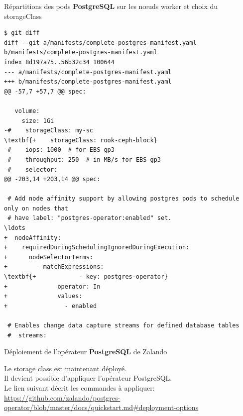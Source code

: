 \begin{frame}[shrink=5,fragile]{Répartitions des pods \textbf{PostgreSQL} sur les n{\oe}uds worker et choix du storageClass}

\begin{tiny}
\begin{Verbatim}[commandchars=\\\{\}]
$ git diff
diff --git a/manifests/complete-postgres-manifest.yaml b/manifests/complete-postgres-manifest.yaml
index 8d197a75..56b32c34 100644
--- a/manifests/complete-postgres-manifest.yaml
+++ b/manifests/complete-postgres-manifest.yaml
@@ -57,7 +57,7 @@ spec:
 
   volume:
     size: 1Gi
-#    storageClass: my-sc
\textbf{+    storageClass: rook-ceph-block}
 #    iops: 1000  # for EBS gp3
 #    throughput: 250  # in MB/s for EBS gp3
 #    selector:
@@ -203,14 +203,14 @@ spec:
 
 # Add node affinity support by allowing postgres pods to schedule only on nodes that
 # have label: "postgres-operator:enabled" set.
\ldots
+  nodeAffinity:
+    requiredDuringSchedulingIgnoredDuringExecution:
+      nodeSelectorTerms:
+        - matchExpressions:
\textbf{+            - key: postgres-operator}
+              operator: In
+              values:
+                - enabled
 
 # Enables change data capture streams for defined database tables
 #  streams:
\end{Verbatim}
\end{tiny}

\end{frame}


\begin{frame}[fragile]{Déploiement de l'opérateur \textbf{PostgreSQL} de Zalando}

Le storage class est maintenant déployé.\\
Il devient possible d'appliquer l'opérateur PostgreSQL.\\
Le lien suivant décrit les commandes à appliquer:\\
\tiny{\url{https://github.com/zalando/postgres-operator/blob/master/docs/quickstart.md#deployment-options}}

\end{frame}


